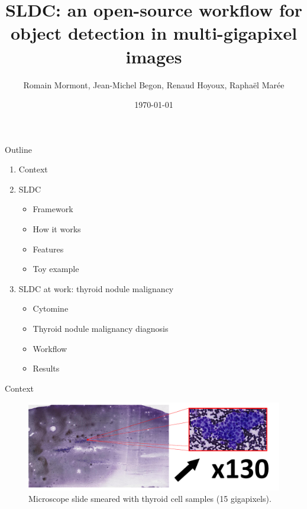 \documentclass{beamer}
\title{{\bf SLDC: an open-source workflow for object detection in multi-gigapixel images}}
\author{Romain Mormont, Jean-Michel Begon, Renaud Hoyoux, Raphaël Marée}
\institute{Montefiore Institute, University of Liège, Belgium}
\date{\today}
\begin{document}
\renewcommand{\inserttotalframenumber}{19}


\begin{frame}
\titlepage
\end{frame}

\begin{frame}{Outline}

	\begin{enumerate}

		\item Context
		
		\item SLDC
		\begin{itemize}
			\item Framework
			\item How it works
			\item Features
			\item Toy example		
		\end{itemize}

		\item SLDC at work: thyroid nodule malignancy
		\begin{itemize}
			\item Cytomine
			\item Thyroid nodule malignancy diagnosis
			\item Workflow
			\item Results
		\end{itemize}
		
	\end{enumerate}

\end{frame}


\begin{frame}{Context}
	\vfill
	\begin{figure}[h]
	\center
	\includegraphics[scale=0.19]{images/whole-slide-dim.png}
	\caption{Microscope slide smeared with thyroid cell samples (15 gigapixels).}
	\end{figure}
	\vfill
\end{frame}
\end{document}
